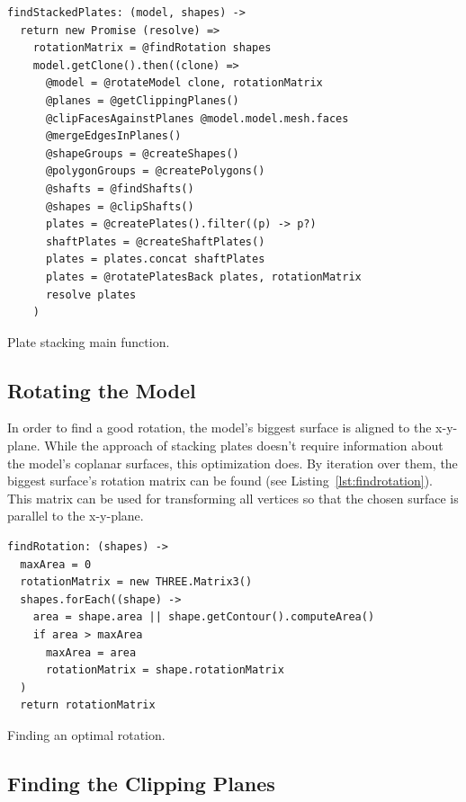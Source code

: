 \documentclass[../ClassicThesis.tex]{subfiles}
\begin{document}
\begin{listing}
\begin{verbatim}
findStackedPlates: (model, shapes) ->
  return new Promise (resolve) =>
    rotationMatrix = @findRotation shapes
    model.getClone().then((clone) =>
      @model = @rotateModel clone, rotationMatrix
      @planes = @getClippingPlanes()
      @clipFacesAgainstPlanes @model.model.mesh.faces
      @mergeEdgesInPlanes()
      @shapeGroups = @createShapes()
      @polygonGroups = @createPolygons()
      @shafts = @findShafts()
      @shapes = @clipShafts()
      plates = @createPlates().filter((p) -> p?)
      shaftPlates = @createShaftPlates()
      plates = plates.concat shaftPlates
      plates = @rotatePlatesBack plates, rotationMatrix
      resolve plates
    )
\end{verbatim}
\caption{Plate stacking main function.}
\label{lst:stackedmain}
\end{listing}

\subsection{Rotating the Model}

In order to find a good rotation, the model's biggest surface is aligned to the x-y-plane. While the approach of stacking plates doesn't require information about the model's coplanar surfaces, this optimization does. By iteration over them, the biggest surface's rotation matrix can be found (see Listing~\ref{lst:findrotation}). This matrix can be used for transforming all vertices so that the chosen surface is parallel to the x-y-plane.

\begin{listing}
\begin{verbatim}
findRotation: (shapes) ->
  maxArea = 0
  rotationMatrix = new THREE.Matrix3()
  shapes.forEach((shape) ->
    area = shape.area || shape.getContour().computeArea()
    if area > maxArea
      maxArea = area
      rotationMatrix = shape.rotationMatrix
  )
  return rotationMatrix
\end{verbatim}
\caption{Finding an optimal rotation.}
\label{lst:findrotation}
\end{listing}

\subsection{Finding the Clipping Planes}
\end{document}
